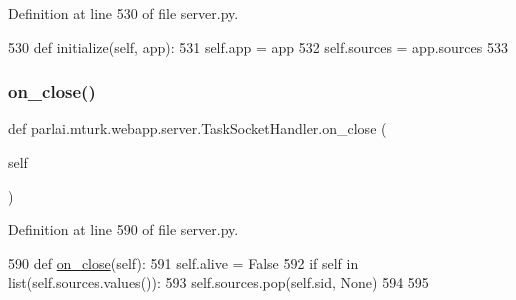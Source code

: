 Definition at line 530 of file server.\+py.


\begin{DoxyCode}
530     \textcolor{keyword}{def }initialize(self, app):
531         self.app = app
532         self.sources = app.sources
533 
\end{DoxyCode}
\mbox{\label{classparlai_1_1mturk_1_1webapp_1_1server_1_1TaskSocketHandler_a9bf75a90b26ccfe8ba72a5cea8612035}} 
\subsubsection{\texorpdfstring{on\+\_\+close()}{on\_close()}}
{\footnotesize\ttfamily def parlai.\+mturk.\+webapp.\+server.\+Task\+Socket\+Handler.\+on\+\_\+close (\begin{DoxyParamCaption}\item[{}]{self }\end{DoxyParamCaption})}



Definition at line 590 of file server.\+py.


\begin{DoxyCode}
590     \textcolor{keyword}{def }\hyperlink{namespaceparlai_1_1chat__service_1_1services_1_1browser__chat_1_1client_add94040308bad4454cbcf4c8010d0c51}{on\_close}(self):
591         self.alive = \textcolor{keyword}{False}
592         \textcolor{keywordflow}{if} self \textcolor{keywordflow}{in} list(self.sources.values()):
593             self.sources.pop(self.sid, \textcolor{keywordtype}{None})
594 
595 
\end{DoxyCode}
\mbox{\label{classparlai_1_1mturk_1_1webapp_1_1server_1_1TaskSocketHandler_a5d4b5ce22544ee8eab0063586b9e5fe8}} 
